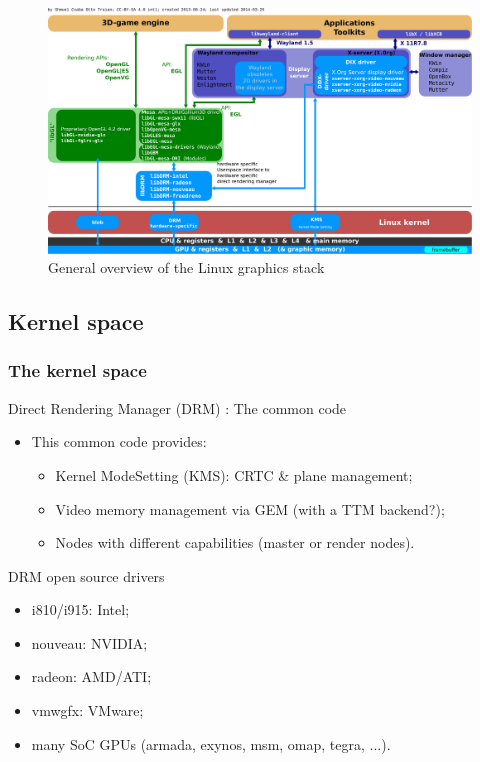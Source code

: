 \documentclass[11pt,english,compress]{beamer}
\begin{document}
\begin{frame}
	\begin{figure}[h]
		\centering
		\includegraphics[width=1.02\linewidth]{imgs/Linux_Graphics_Stack_2013.pdf}
		\caption{General overview of the Linux graphics stack}
	\end{figure}
\end{frame}

\subsection{Kernel space}

\begin{frame}
	\frametitle{The kernel space}

	\begin{block}{Direct Rendering Manager (DRM) : The common code}
		\begin{itemize}
			\item This common code provides:
			\begin{itemize}
				\item Kernel ModeSetting (KMS): CRTC \& plane management;
				\item Video memory management via GEM (with a TTM backend?);
				\item Nodes with different capabilities (master or render nodes).
			\end{itemize}
		\end{itemize}
	\end{block}

	\begin{block}{DRM open source drivers}
		\begin{itemize}
			\item i810/i915: Intel;
			\item nouveau: NVIDIA;
			\item radeon: AMD/ATI;
			\item vmwgfx: VMware;
			\item many SoC GPUs (armada, exynos, msm, omap, tegra, ...).
		\end{itemize}
	\end{block}
\end{frame}
\end{document}
